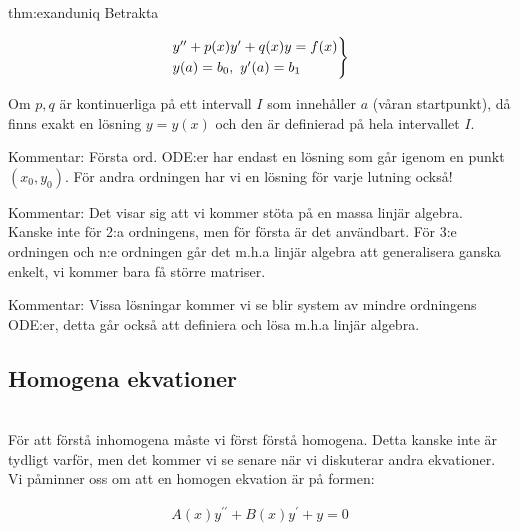 \begin{theo}[Existens]{thm:exanduniq}
  Betrakta 

  \begin{equation*}
    \begin{rcases*}
      y^{\prime\prime}+p(x)y^{\prime}+q(x)y=f(x)\\
      y(a)=b_0, \text{  } y^{\prime}(a)=b_1
    \end{rcases*}
  \end{equation*}
  \par\bigskip
  \noindent Om $p, q$ är kontinuerliga på ett intervall $I$ som innehåller $a$ (våran startpunkt), då finns exakt en lösning $y=y(x)$ och den är definierad på hela intervallet $I$.
\end{theo}
\par\bigskip

\noindent Kommentar: Första ord. ODE:er har endast en lösning som går igenom en punkt $(x_0,y_0)$. För andra ordningen har vi en lösning för varje lutning också!
\par\bigskip
\noindent Kommentar: Det visar sig att vi kommer stöta på en massa linjär algebra. Kanske inte för 2:a ordningens, men för första är det användbart. För 3:e ordningen och n:e ordningen går det m.h.a linjär algebra att generalisera ganska enkelt, vi kommer bara få större matriser.
\par\bigskip

\noindent Kommentar: Vissa lösningar kommer vi se blir system av mindre ordningens ODE:er, detta går också att definiera och lösa m.h.a linjär algebra.

\par\bigskip

\subsection{Homogena ekvationer}\hfill\\

\noindent  För att förstå inhomogena måste vi först förstå homogena. Detta kanske inte är tydligt varför, men det kommer vi se senare när vi diskuterar andra ekvationer. Vi påminner oss om att en homogen ekvation är på formen:


\begin{equation*}
  \begin{gathered}
    A(x)y^{\prime\prime}+B(x)y^{\prime}+y=0
  \end{gathered}
\end{equation*}
\par\bigskip

